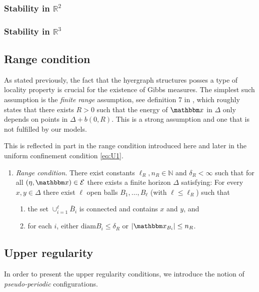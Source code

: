 \subsubsection{Stability in $\mathbb R^2$}
\tbd
\subsubsection{Stability in $\mathbb R^3$}
\tbd
{}

\subsection{Range condition} \label{sec:range}
As stated previously, the fact that the hyergraph structures posses a type of locality property is crucial for the existence of Gibbs measures. The simplest such assumption is the \textit{finite range} assumption, see definition 7 in \cite{Dereudre2017}, which roughly states that there exists $R>0$ such that the energy of $\x$ in $\Delta$ only depends on points in $\Delta + b(0,R)$. This is a strong assumption and one that is not fulfilled by our models. 

This is reflected in part in the range condition introduced here and later in the uniform confinement condition \ref{eq:U1}.

\begin{enumerate}[\textbf{(R)}]\label{(R)}
	\item \textit{Range condition}. There exist constants $\ell_R,n_R \in \mathbb N$ and $\delta_R < \infty$ such that for all $(\eta,\x) \in \mathcal E$ there exists a finite horizon $\Delta$ satisfying: For every $x,y \in \Delta$ there exist $\ell$ open balls $B_1, \dots, B_\ell$ (with $\ell \leq \ell_R$) such that
	\begin{enumerate}[-]
		\item the set $\cup^\ell_{i=1} \bar B_i$ is connected and contains $x$ and $y$, and 
		\item for each $i$, either $\text{diam} B_i \leq \delta_R$ or $|\x_{B_i}| \leq n_R$.
	\end{enumerate}
\end{enumerate}

\subsection{Upper regularity}


In order to present the upper regularity conditions, we introduce the notion of \textit{pseudo-periodic} configurations. 

